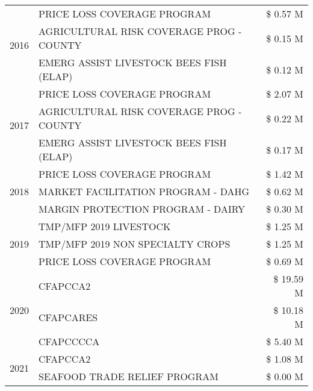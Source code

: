 \begin{tabular}{llr}
\multirow[t]{3}{*}{2016} & PRICE LOSS COVERAGE PROGRAM                   & \$ 0.57 M \\
 & AGRICULTURAL RISK COVERAGE PROG - COUNTY      & \$ 0.15 M \\
 & EMERG ASSIST LIVESTOCK BEES FISH (ELAP)       & \$ 0.12 M \\
\cline{1-3}
\multirow[t]{3}{*}{2017} & PRICE LOSS COVERAGE PROGRAM & \$ 2.07 M \\
 & AGRICULTURAL RISK COVERAGE PROG - COUNTY & \$ 0.22 M \\
 & EMERG ASSIST LIVESTOCK BEES FISH (ELAP) & \$ 0.17 M \\
\cline{1-3}
\multirow[t]{3}{*}{2018} & PRICE LOSS COVERAGE PROGRAM & \$ 1.42 M \\
 & MARKET FACILITATION PROGRAM - DAHG & \$ 0.62 M \\
 & MARGIN PROTECTION PROGRAM - DAIRY & \$ 0.30 M \\
\cline{1-3}
\multirow[t]{3}{*}{2019} & TMP/MFP 2019 LIVESTOCK & \$ 1.25 M \\
 & TMP/MFP 2019 NON SPECIALTY CROPS & \$ 1.25 M \\
 & PRICE LOSS COVERAGE PROGRAM & \$ 0.69 M \\
\cline{1-3}
\multirow[t]{3}{*}{2020} & CFAPCCA2 & \$ 19.59 M \\
 & CFAPCARES & \$ 10.18 M \\
 & CFAPCCCCA & \$ 5.40 M \\
\cline{1-3}
\multirow[t]{2}{*}{2021} & CFAPCCA2 & \$ 1.08 M \\
 & SEAFOOD TRADE RELIEF PROGRAM & \$ 0.00 M \\
\cline{1-3}
\bottomrule
\end{tabular}
